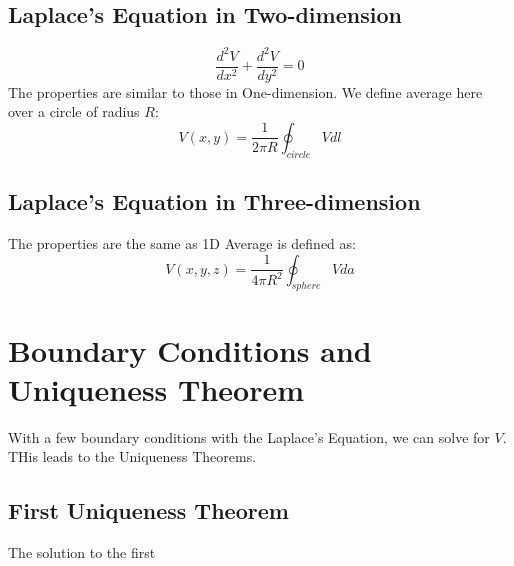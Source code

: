 \documentclass{article}
\begin{document}
\subsection{Laplace's Equation in Two-dimension}
\[ \frac{d^2 V}{dx^2} + \frac{d^2 V}{dy^2} = 0\]
The properties are similar to those in One-dimension.
We define average here over a circle of radius $R$:
\[ V(x,y) = \frac{1}{2 \pi R} \oint_{circle} V dl\]
\subsection{Laplace's Equation in Three-dimension}
The properties are the same as 1D
Average is defined as:
\[ V(x,y,z) = \frac{1}{4 \pi R^2} \oint_{sphere} V da\]

\section{Boundary Conditions and Uniqueness Theorem}
With a few boundary conditions with the Laplace's Equation, we can solve for $V$. THis leads to the Uniqueness Theorems.

\subsection{First Uniqueness Theorem}
The solution to the first 
\end{document}

